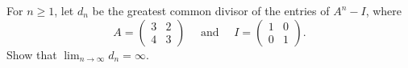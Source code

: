 For $n \geq 1$, let $d_n$ be the greatest common divisor of the entries of
$A^n - I$, where
\[
A = \begin{pmatrix} 3 & 2 \\ 4 & 3 \end{pmatrix}
\quad \mbox{ and } \quad
I = \begin{pmatrix} 1 & 0 \\ 0 & 1 \end{pmatrix}.
\]
Show that $\lim_{n \to \infty} d_n = \infty$.
